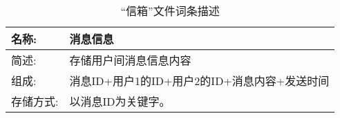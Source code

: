 \begin{table}[H]  
\caption{“信箱”文件词条描述}  
\begin{center}  
    \begin{tabular}{l p{10cm}} 
        \hline
        \quad 名称:  &   消息信息 \\
        \hline
        \quad 简述:  & 存储用户间消息信息内容\\
        \hline
        \quad 组成:  & 消息ID+用户1的ID+用户2的ID+消息内容+发送时间 \\
        \hline
        \quad 存储方式:  & 以消息ID为关键字。 \\
        \hline
    \end{tabular}
    \label{tab1}
\end{center}
\end{table}
